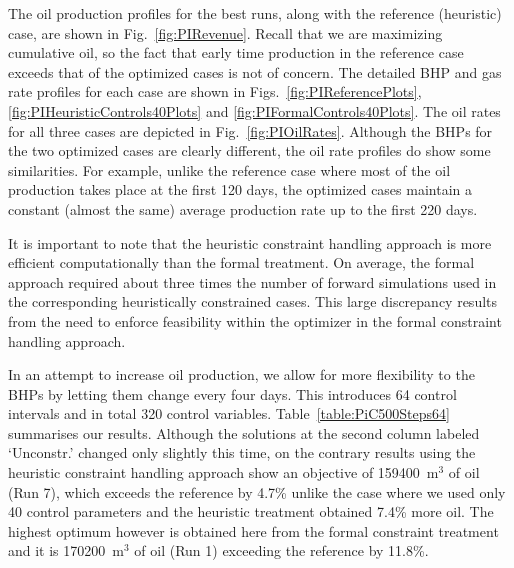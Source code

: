 \documentclass[twocolumn,numbook]{svjour3}          %
\begin{document}
The oil production profiles for the best runs, along with the reference
(heuristic) case, are shown in Fig.~\ref{fig:PIRevenue}. Recall that
we are maximizing cumulative oil, so the fact that early time production in the
reference case exceeds that of the optimized cases is not of concern. The
detailed BHP and gas rate profiles for each case are shown in Figs.~\ref{fig:PIReferencePlots},
\ref{fig:PIHeuristicControls40Plots} and \ref{fig:PIFormalControls40Plots}. The oil rates for all three
cases are depicted in Fig.~\ref{fig:PIOilRates}. Although the BHPs for the two
optimized cases are clearly different, the oil rate profiles do show some
similarities. For example, unlike the reference case where most of the oil production takes
place at the first 120 days, the optimized cases maintain a constant (almost the same) average production 
rate up to the first 220 days.

It is important to note that the heuristic constraint handling approach is
more efficient computationally than the formal treatment. On average,
the formal approach required about three times the number of forward
simulations used in the corresponding heuristically constrained cases. This
large discrepancy results from the need to enforce feasibility within the
optimizer in the formal constraint handling approach.


In an attempt to increase oil production, we allow for more flexibility to the 
BHPs by letting them change every four days. This introduces 64 control
intervals and in total 320 control variables. Table~\ref{table:PiC500Steps64}
summarises our results. Although the solutions at the second column labeled
`Unconstr.' changed only slightly this time, on the contrary results using the 
heuristic constraint handling approach show an objective of 159400~m$^3$ of oil (Run 7),
 which exceeds the reference by 4.7\% unlike the case where we used only 40 
 control parameters and the heuristic treatment obtained 7.4\% more oil. 
 The highest optimum however is obtained here from the formal constraint 
 treatment and it is 170200~m$^3$ of oil (Run 1) exceeding
 the reference by 11.8\%.
\end{document}
